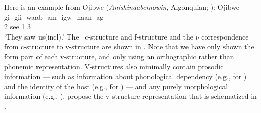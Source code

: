 \documentclass[output=paper,hidelinks]{langscibook}
\begin{document}
Here is an example from Ojibwe (\textit{Anishinaabemowin},
Algonquian; \citealt[288]{Melchin2020}):
%
\ea\label{ex:ojibwe-see} Ojibwe\\
  \gll
  gi- gii- waab -am -igw -naan -ag \\
    2  see   1 3\\
  \glt `They saw us(incl).'
\z
%
The \lrfg\ c-structure and f-structure and the
$\nu$ correspondence from c-structure to v-structure
are shown in  \citep[288]{Melchin2020}.
%
%
Note that we have only shown the form part of each v-structure, and
only using an orthographic rather than phonemic
representation. V-structures also minimally contain prosodic
information --- such as information about phonological dependency
(e.g., for ) and the identity of the host (e.g., for
) --- and any {purely} morphological information
(e.g., ).
\citet{asudeh;bogel;siddiqi-momot} propose the v-structure
representation that is schematized in . %
%
  
\end{document}
